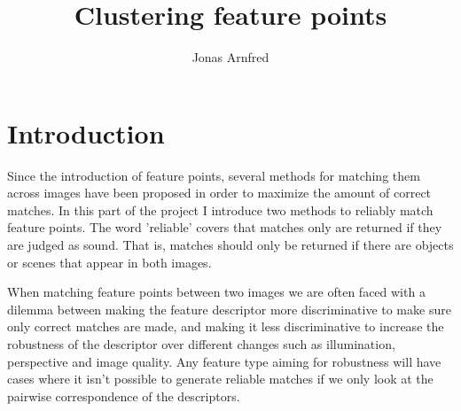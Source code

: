 \documentclass{article}
\begin{document}
\title{Clustering feature points}
\author{Jonas Arnfred}

\maketitle

\begin{abstract}
\end{abstract}

\section{Introduction}

Since the introduction of feature points, several methods for matching 
them across images have been proposed in order to maximize the amount of 
correct matches. In this part of the project I introduce two methods to 
reliably match feature points. The word 'reliable' covers that matches 
only are returned if they are judged as sound. That is, matches should 
only be returned if there are objects or scenes that appear in both 
images.

When matching feature points between two images we are often faced with 
a dilemma between making the feature descriptor more discriminative to 
make sure only correct matches are made, and making it less 
discriminative to increase the robustness of the descriptor over 
different changes such as illumination, perspective and image quality.  
Any feature type aiming for robustness will have cases where it isn't 
possible to generate reliable matches if we only look at the pairwise 
correspondence of the descriptors. 
\end{document}
